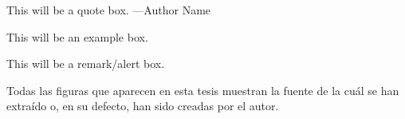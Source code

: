 \begin{quoteBox}
  This will be a quote box.
  \tcblower
  ---Author Name
\end{quoteBox}

\begin{exampleBox}
  This will be an example box.
\end{exampleBox}

\begin{remarkBox}
  This will be a remark/alert box.
\end{remarkBox}

Todas las figuras que aparecen en esta tesis muestran la fuente de la cuál se
han extraído o, en su defecto, han sido creadas por el autor.
